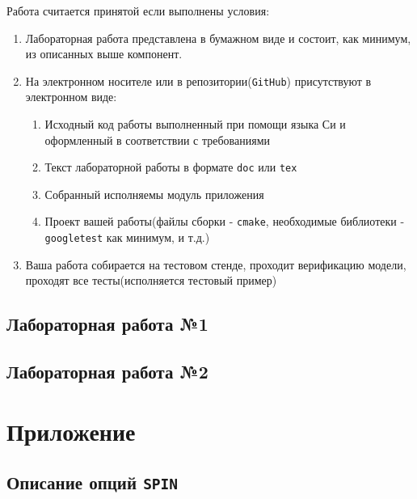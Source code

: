 \documentclass[12pt, twoside]{report}
\begin{document}
Работа считается принятой если выполнены условия:
\begin{enumerate}
  \item Лабораторная работа представлена в бумажном виде и состоит, как минимум, из описанных выше компонент.
  \item На электронном носителе или в репозитории(\texttt{GitHub}) присутствуют в электронном виде:
    \begin{enumerate}
      \item Исходный код работы выполненный при помощи языка Си и оформленный в соответствии с требованиями 
      \item Текст лабораторной работы в формате \texttt{doc} или \texttt{tex}
      \item Собранный исполняемы модуль приложения
      \item Проект вашей работы(файлы сборки - \texttt{cmake}, необходимые библиотеки - \texttt{googletest} как минимум, и т.д.)
    \end{enumerate}
  \item Ваша работа собирается на тестовом стенде, проходит верификацию модели, проходят все тесты(исполняется тестовый пример)
\end{enumerate}

\newpage
\section*{Лабораторная работа №1}\label{lab_work_1}


\newpage
\section*{Лабораторная работа №2}\label{lab_work_2}


\newpage
\chapter*{Приложение}\label{addons}

\section*{Описание опций \texttt{SPIN}}\label{spin_quick_REFERENCE}
\end{document}

